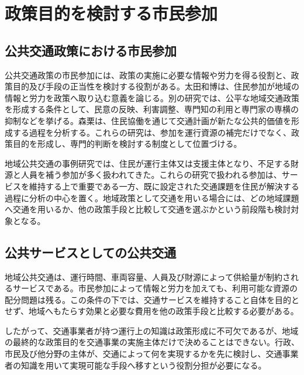 \section{政策目的を検討する市民参加}
\label{sec:ch4_citizen_participation_view}

\subsection{公共交通政策における市民参加}
\label{subsec:ch4_citizen_participation}

公共交通政策の市民参加には、政策の実施に必要な情報や労力を得る役割と、政策目的及び手段の正当性を検討する役割がある。太田和博は、住民参加が地域の情報と労力を政策へ取り込む意義を論じる\cite{ota2009citizen}。別の研究では、公平な地域交通政策を形成する条件として、民意の反映、利害調整、専門知の利用と専門家の専横の抑制などを挙げる\cite{ota2000policy}。森栗は、住民協働を通じて交通計画が新たな公共的価値を形成する過程を分析する\cite{moriuri2009collaboration}。これらの研究は、参加を運行資源の補完だけでなく、政策目的を形成し、専門的判断を検討する制度として位置づける。

地域公共交通の事例研究では、住民が運行主体又は支援主体となり、不足する財源と人員を補う参加が多く扱われてきた。これらの研究で扱われる参加は、サービスを維持する上で重要である一方、既に設定された交通課題を住民が解決する過程に分析の中心を置く。地域政策として交通を用いる場合には、どの地域課題へ交通を用いるか、他の政策手段と比較して交通を選ぶかという前段階も検討対象となる。

\subsection{公共サービスとしての公共交通}
\label{subsec:ch4_public_service}

地域公共交通は、運行時間、車両容量、人員及び財源によって供給量が制約されるサービスである。市民参加によって情報と労力を加えても、利用可能な資源の配分問題は残る。この条件の下では、交通サービスを維持すること自体を目的とせず、地域へもたらす効果と必要な費用を他の政策手段と比較する必要がある。

したがって、交通事業者が持つ運行上の知識は政策形成に不可欠であるが、地域の最終的な政策目的を交通事業の実施主体だけで決めることはできない。行政、市民及び他分野の主体が、交通によって何を実現するかを先に検討し、交通事業者の知識を用いて実現可能な手段へ移すという役割分担が必要になる。

